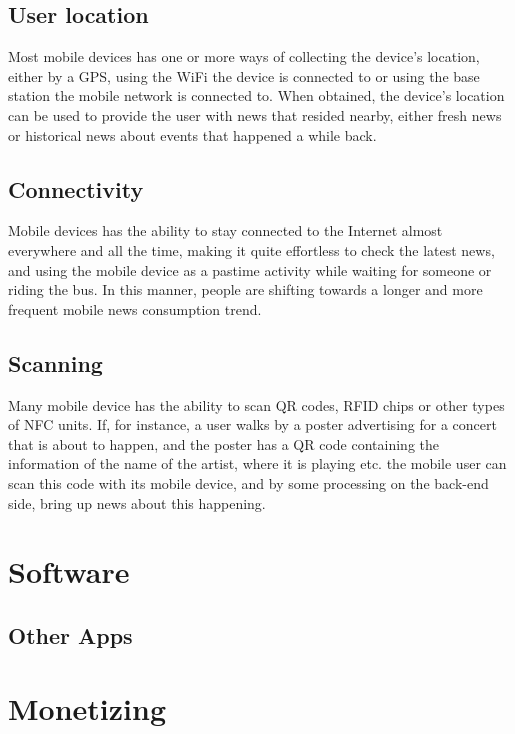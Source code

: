 \subsection{User location}
Most mobile devices has one or more ways of collecting the device's location, either by a GPS, using the WiFi the device is connected to or using the base station the mobile network is connected to. When obtained, the device's location can be used to provide the user with news that resided nearby, either fresh news or historical news about events that happened a while back.

\subsection{Connectivity}
Mobile devices has the ability to stay connected to the Internet almost everywhere and all the time, making it quite effortless to check the latest news, and using the mobile device as a pastime activity while waiting for someone or riding the bus. In this manner, people are shifting towards a longer and more frequent mobile news consumption trend\cite{stateofthemedia2012}.

\subsection{Scanning}
Many mobile device has the ability to scan QR codes, RFID chips or other types of NFC units. If, for instance, a user walks by a poster advertising for a concert that is about to happen, and the poster has a QR code containing the information of the name of the artist, where it is playing etc. the mobile user can scan this code with its mobile device, and by some processing on the back-end side, bring up news about this happening.

\section{Software}

\subsection{Other Apps}


\section{Monetizing}